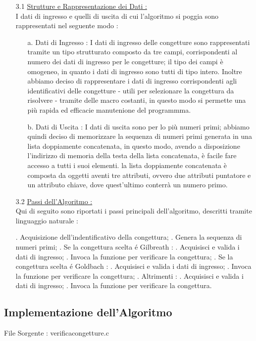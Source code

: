 \documentclass{article}
\begin{document}
        \begin{enumerate}
    \Large \item[3.1] \underline{Strutture e Rappresentazione dei Dati : } 
    \large \\I dati di ingresso e quelli di uscita di cui l'algoritmo si poggia sono rappresentati nel seguente modo : 
    \begin{enumerate}
        \item[a.] Dati di Ingresso : I dati di ingresso delle congetture sono rappresentati tramite un tipo strutturato composto da tre campi, corrispondenti al numero dei dati di ingresso per le congetture; il tipo dei campi è omogeneo, in quanto i dati di ingresso sono tutti di tipo intero. Inoltre abbiamo deciso di rappresentare i dati di ingresso corrispondenti agli identificativi delle congetture - utili per selezionare la congettura da risolvere - tramite delle macro costanti, in questo modo si permette una più rapida ed efficacie manutenione del programmma.
        \item[b.] Dati di Uscita : I dati di uscita sono per lo più numeri primi; abbiamo quindi deciso di memorizzare la sequenza di numeri primi generata in una lista doppiamente concatenata, in questo modo, avendo a disposizione l'indirizzo di memoria della testa della lista concatenata, è facile fare accesso a tutti i suoi elementi. la lista doppiamente concatenata è composta da oggetti aventi tre attributi, ovvero due attributi puntatore e un attributo chiave, dove quest'ultimo conterrà un numero primo. 
    \end{enumerate}
    \Large \item[3.2] \underline{Passi dell'Algoritmo : }
    \large\\ Qui di seguito sono riportati i passi principali dell'algoritmo, descritti tramite linguaggio naturale : 

 
   \begin{algorithmic}
   . Acquisizione dell'indentificativo della congettura;
   . Genera la sequenza di numeri primi;
   . Se la congettura scelta é Gilbreath : 
   .  Acquisisci e valida i dati di ingresso;
   .   Invoca la funzione per verificare la congettura; 
   . Se la congettura scelta é Goldbach : 
   .   Acquisisci e valida i dati di ingresso;
   .   Invoca la funzione per verificare la congettura;
   . Altrimenti : 
   .   Acquisisci e valida i dati di ingresso;
   .   Invoca la funzione per verificare la congettura.
   \end{algorithmic}
 
\end{enumerate}
    
\newpage
\begin{center}
    \section{Implementazione dell'Algoritmo}
\end{center}
File Sorgente : verifica\textunderscore congetture.c
\end{document}
